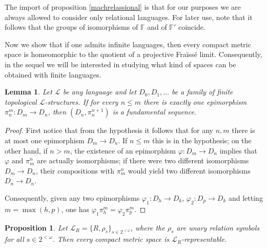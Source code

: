 \documentclass[12pt,twoside,a4paper]{amsart}
\theoremstyle{plain}
\newtheorem{lemma}[theorem]{Lemma}
\newtheorem{proposition}[theorem]{Proposition}
\theoremstyle{definition}
\begin{document}
The import of proposition \ref{machrelassional} is that for our purposes we are always allowed to consider only relational languages.
For later use, note that it follows that the groups of isomorphisms of $ \mathbb F $ and of $ \mathbb F'$ coincide.

Now we show that if one admits infinite languages, then every compact metric space is homeomorphic to the quotient of a projective Fra\"iss\'e limit.
Consequently, in the sequel we will be interested in studying what kind of spaces can be obtained with finite languages.

\begin{lemma} \label{rigidity}
Let $ \mathcal L $ be any language and let $D_0,D_1,\ldots $ be a family of finite topological $ \mathcal L $-structures.
If for every $n\leq m$ there is exactly one epimorphism $\pi_n^m:D_m\to D_n$, then $(D_n,\pi_n^{n+1})$ is a fundamental sequence.
\end{lemma}

\begin{proof}
First notice that from the hypothesis it follows that for any $n,m$ there is at most one epimorphism $D_m\to D_n$.
If $n\leq m$ this is in the hypothesis; on the other hand, if $n>m$, the existence of an epimorphism $ {\varphi} :D_m\to D_n$ implies that $ {\varphi} $ and $\pi_m^n$ are actually isomorphisms; if there were two different isomorphisms $D_m\to D_n$, their compositions with $\pi_m^n$ would yield two different isomorphisms $D_n\to D_n$.

Consequently, given any two epimorphisms $ {\varphi}_1:D_h\to D_k$, $ {\varphi}_2:D_p\to D_k$ and letting $m=\max (h,p)$, one has $ {\varphi}_1\pi_h^m= {\varphi}_2\pi_p^m$.
\end{proof}

\begin{proposition}
Let $ \mathcal L_R=\{ R,\rho_s\}_{s\in 2^{<\omega }}$, where the $\rho_s$ are unary relation symbols for all $s\in 2^{<\omega }$.
Then every compact metric space is $ \mathcal L_R$-representable.
\end{proposition}
\end{document}
